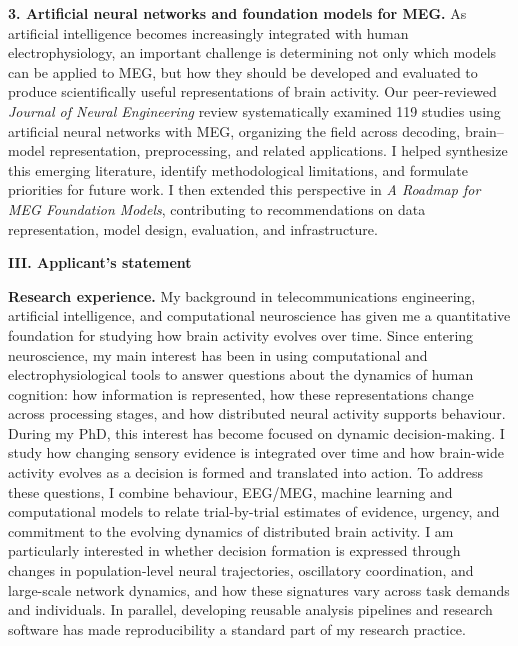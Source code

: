 \documentclass[12pt,letterpaper]{article}
\newcommand{\partheading}[1]{%
  \noindent\textbf{#1}\par\vspace{1pt}%
}
\begin{document}
\vspace{0pt}%
\textbf{3. Artificial neural networks and foundation models for MEG.}
As artificial intelligence becomes increasingly integrated with human electrophysiology,
an important challenge is determining not only which models can be applied to MEG, but
how they should be developed and evaluated to produce scientifically useful
representations of brain activity. Our peer-reviewed \textit{Journal of Neural Engineering}
review systematically examined 119 studies using artificial neural networks with MEG,
organizing the field across decoding, brain--model representation, preprocessing, and
related applications. I helped synthesize this emerging literature, identify methodological
limitations, and formulate priorities for future work. I then extended this
perspective in \textit{A Roadmap for MEG Foundation Models}, contributing to
recommendations on data representation, model design, evaluation, and infrastructure.

\partheading{III. Applicant's statement}

\noindent\textbf{Research experience.} My background in telecommunications engineering, artificial intelligence, and
computational neuroscience has given me a quantitative foundation for studying how
brain activity evolves over time. Since entering neuroscience, my main interest has
been in using computational and electrophysiological tools to answer questions about
the dynamics of human cognition: how information is represented, how these
representations change across processing stages, and how distributed neural activity
supports behaviour. During my PhD, this interest has become focused on dynamic decision-making. I study how
changing sensory evidence is integrated over time and how brain-wide activity evolves
as a decision is formed and translated into action. To address these questions, I combine
behaviour, EEG/MEG, machine learning and computational models to relate trial-by-trial estimates of
evidence, urgency, and commitment to the evolving dynamics of distributed brain activity.
I am particularly interested in whether decision formation is expressed through changes
in population-level neural trajectories, oscillatory coordination, and large-scale
network dynamics, and how these signatures vary across task demands and individuals.
In parallel, developing reusable analysis pipelines and research software has made
reproducibility a standard part of my research practice.
\end{document}
